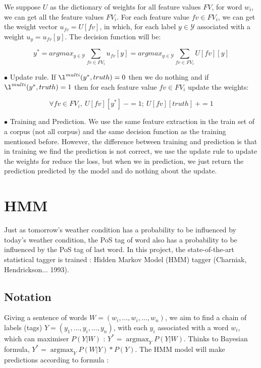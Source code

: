 \documentclass{article}
\def\YY{{\mathcal{Y}}}
\begin{document}
We suppose $U$ as the dictionary of weights for all feature values $FV$,  for word $w_i$, we can get all the feature values $FV_i$. For each feature value $fv \in FV_i$, we can get the weight vector $u_{fv} = U[fv]$, in which, for each label $y \in \YY$ associated with a weight $u_y = u_{fv} [y]$. The decision function will be:

\begin{equation}
y^* = argmax_{y \in \YY} \sum_{fv \in FV_i} {u_{fv}[y]}
= argmax_{y \in \YY} \sum_{fv \in FV_i} {U[fv][y]}
\end{equation}

$\bullet$ Update rule. If $\l^{multi}(y^*, truth) = 0$ then we do nothing and if $\l^{multi}(y^*, truth) = 1$ then for each feature value $fv \in FV_i$ update the weights:

\begin{equation}
\forall fv \in FV_i,\  U[fv][y^*]\ -= 1;\ U[fv][truth]\ += 1
\end{equation} 

$\bullet$ Training and Prediction. We use the same feature extraction in the train set of a corpus (not all corpus) and the same decision function as the training mentioned before. However, the difference between training and prediction is that in training we find the prediction is not correct, we use the update rule to update the weights for reduce the loss, but when we in prediction, we just return the prediction predicted by the model and do nothing about the update.

\section{HMM}
Just as tomorrow's weather condition has a probability to be influenced by today's weather condition, the PoS tag of word also has a probability to be influenced by the PoS tag of last word. 
In this project, the state-of-the-art statistical tagger is trained : Hidden Markov Model (HMM) tagger (Charniak, Hendrickson... 1993).

\subsection{Notation}

Giving a sentence of words $W = (w_i,\dots,w_i,\dots,w_n)$, we aim to find a chain of labels (tags) $Y = (y_1,\dots,y_i,\dots,y_n)$, with each $y_i$ associated with a word $w_i$, which can maximiser $P(Y|W)$ : $Y^* = \mathop{\arg\max}_{Y} P(Y|W)$. Thinks to Bayesian formula, $Y^* = \mathop{\arg\max}_{Y} P(W|Y)*P(Y)$. The HMM model will make predictions according to formula :
\end{document}
